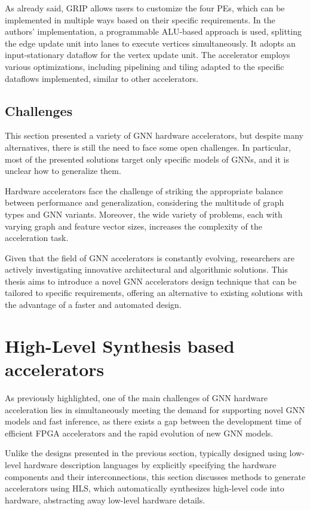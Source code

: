 As already said, GRIP allows users to customize the four PEs, which can be implemented in multiple ways based on their specific requirements.
In the authors' implementation, a programmable ALU-based approach is used, splitting the edge update unit into lanes to execute vertices simultaneously.
It adopts an input-stationary dataflow for the vertex update unit.
The accelerator employs various optimizations, including pipelining and tiling adapted to the specific dataflows implemented, similar to other accelerators.

\subsection{Challenges}
\label{subsec:hw-accelerators-discussion}%

This section presented a variety of GNN hardware accelerators, but despite many alternatives, there is still the need to face some open challenges.
In particular, most of the presented solutions target only specific models of GNNs, and it is unclear how to generalize them.

Hardware accelerators face the challenge of striking the appropriate balance between performance and generalization, considering the multitude of graph types and GNN variants.
Moreover, the wide variety of problems, each with varying graph and feature vector sizes, increases the complexity of the acceleration task.

Given that the field of GNN accelerators is constantly evolving, researchers are actively investigating innovative architectural and algorithmic solutions.
This thesis aims to introduce a novel GNN accelerators design technique that can be tailored to specific requirements, offering an alternative to existing solutions with the advantage of a faster and automated design.

\section{High-Level Synthesis based accelerators}
\label{sec:hls-accelerators}%

As previously highlighted, one of the main challenges of GNN hardware acceleration lies in simultaneously meeting the demand for supporting novel GNN models and fast inference, as there exists a gap between the development time of efficient FPGA accelerators and the rapid evolution of new GNN models.

Unlike the designs presented in the previous section, typically designed using low-level hardware description languages by explicitly specifying the hardware components and their interconnections, this section discusses methods to generate accelerators using HLS, which automatically synthesizes high-level code into hardware, abstracting away low-level hardware details.

